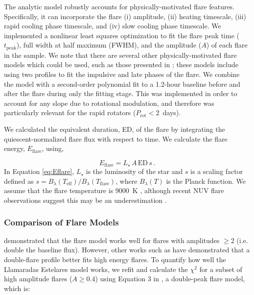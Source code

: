 \documentclass[twocolumn]{aastex631}
\begin{document}
The analytic model robustly  accounts for physically-motivated flare features.
Specifically, it can incorporate the flare (i) amplitude, (ii) heating timescale,
(iii) rapid cooling phase timescale, and (iv) slow cooling phase timescale. We
implemented a nonlinear least squares optimization to fit the flare peak time
($t_\textrm{peak}$), full width at half maximum (FWHM), and the amplitude ($A$)
of each flare in the sample. We note that there are several other
physically-motivated flare models which could be used, such as those presented in
\cite{gryciuk17, pietras22, yang23_lp}; these models include using two profiles to
fit the impulsive and late phases of the flare. We combine the model with a
second-order polynomial fit to a 1.2-hour baseline before and after the flare
during only the fitting stage. This was implemented in order to account for any
slope due to rotational modulation, and therefore was particularly relevant for the
rapid rotators ($P_\textrm{rot} < 2$~days).

We calculated the equivalent duration, ED, of the flare by integrating the
quiescent-normalized flare flux with respect to time. We calculate the flare
energy, $E_\textrm{flare}$, using,

\begin{equation}\label{eq:Eflare}
    E_\textrm{flare} = L_\star \, A \, \textrm{ED} \, s \, .
\end{equation}
In Equation \ref{eq:Eflare}, $L_\star$ is the luminosity of the star and $s$ is a
scaling factor defined as $s = B_\lambda(T_\textrm{eff}) / B_\lambda(T_\textrm{flare})$,
where $B_\lambda(T)$ is the Planck function. We assume that the flare temperature is
9000~K \citep{hawley92, hawley95}, although recent NUV flare observations suggest
this may be an underestimation \citep{kowalski19, brasseur23, berger23}.

\subsubsection{Comparison of Flare Models}

\cite{tovar22} demonstrated that the flare model works well for
flares with amplitudes $\geq 2$ (i.e. double the baseline flux). However, other
works such as \cite{pietras22} have demonstrated that a double-flare profile better
fits high energy flares. To quantify how well the Llamaradas Estelares model works,
we refit and calculate the $\chi^2$ for a subset of high amplitude flares ($A \geq 0.4$)
using Equation 3 in \cite{pietras22}, a double-peak flare model, which is:
\end{document}
